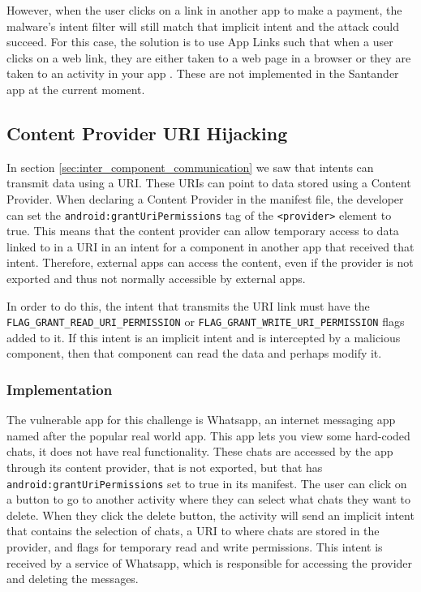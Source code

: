     However, when the user clicks on a link in another app to make a payment, the malware's intent filter will still match that implicit intent and the attack could succeed. For this case, the solution is to use App Links such that when a user clicks on a web link, they are either taken to a web page in a browser or they are taken to an activity in your app \cite{android_app_links}. These are not implemented in the Santander app at the current moment.
    
    \subsection{Content Provider URI Hijacking}
        \label{subsec:provider_uri_hijacking}
        
   In section \ref{sec:inter_component_communication} we saw that intents can transmit data using a URI. These URIs can point to data stored using a Content Provider. When declaring a Content Provider in the manifest file, the developer can set the \lstinline|android:grantUriPermissions| tag of the \lstinline|<provider>| element to true. This means that the content provider can allow temporary access to data linked to in a URI in an intent for a component in another app that received that intent. Therefore, external apps can access the content, even if the provider is not exported and thus not normally accessible by external apps.
    
    In order to do this, the intent that transmits the URI link must have the \lstinline|FLAG_GRANT_READ_URI_PERMISSION| or \lstinline|FLAG_GRANT_WRITE_URI_PERMISSION| flags added to it. If this intent is an implicit intent and is intercepted by a malicious component, then that component can read the data and perhaps modify it.
    
    \subsubsection{Implementation}
        \label{subsubsec:provider_uri_hijack_implementation}
        
    The vulnerable app for this challenge is Whatsapp, an internet messaging app named after the popular real world app. This app lets you view some hard-coded chats, it does not have real functionality. These chats are accessed by the app through its content provider, that is not exported, but that has \lstinline|android:grantUriPermissions| set to true in its manifest. The user can click on a button to go to another activity where they can select what chats they want to delete. When they click the delete button, the activity will send an implicit intent that contains the selection of chats, a URI to where chats are stored in the provider, and flags for temporary read and write permissions. This intent is received by a service of Whatsapp, which is responsible for accessing the provider and deleting the messages.
    
